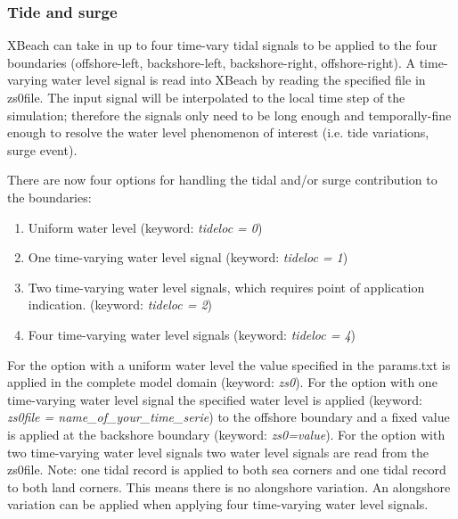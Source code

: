 \documentclass{article}
\begin{document}
\noindent 


\subsubsection{ Tide and surge}

\noindent XBeach can take in up to four time-vary tidal signals to be applied to the four boundaries (offshore-left, backshore-left, backshore-right, offshore-right).  A time-varying water level signal is read into XBeach by reading the specified file in zs0file. The input signal will be interpolated to the local time step of the simulation; therefore the signals only need to be long enough and temporally-fine enough to resolve the water level phenomenon of interest (i.e. tide variations, surge event).

\noindent 

\noindent There are now four options for handling the tidal and/or surge contribution to the boundaries:

\begin{enumerate}
\item  Uniform water level (keyword: \textit{tideloc = 0})

\item  One time-varying water level signal (keyword: \textit{tideloc = 1})

\item  Two time-varying water level signals, which requires point of application indication. (keyword: \textit{tideloc = 2})

\item  Four time-varying water level signals (keyword: \textit{tideloc = 4})
\end{enumerate}

\noindent 

\noindent For the option with a uniform water level the value specified in the params.txt is applied in the complete model domain (keyword: \textit{zs0}). For the option with one time-varying water level signal the specified water level is applied (keyword: \textit{zs0file = name\_of\_your\_time\_serie}) to the offshore boundary and a fixed value is applied at the backshore boundary (keyword: \textit{zs0=value}). For the option with two time-varying water level signals two water level signals are read from the zs0file. Note: one tidal record is applied to both sea corners and one tidal record to both land corners. This means there is no alongshore variation. An alongshore variation can be applied when applying four time-varying water level signals. 
\end{document}
